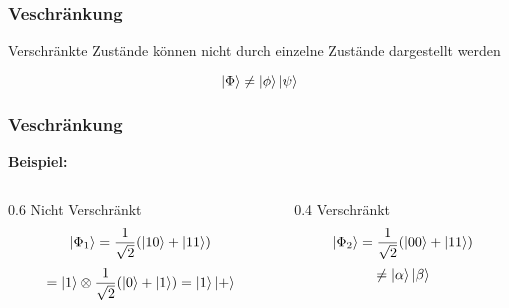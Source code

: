 \begin{frame}
    \frametitle{Veschränkung}
    
    Verschränkte Zustände können nicht durch einzelne Zustände dargestellt werden

    \hfil

    $$\ket{\Phi} \neq \ket{\phi} \ket{\psi}$$

\end{frame}

\begin{frame}
    \frametitle{Veschränkung}
    \textbf{Beispiel:}

    \hfil

    \begin{columns}[c]
        \begin{column}{0.6\hsize}\centering
        Nicht Verschränkt
        $$\ket{\Phi_1} = \frac{1}{\sqrt{2}} ( \ket{10} + \ket{11})$$
        $$= \ket{1}\otimes \frac{1}{\sqrt{2}} ( \ket{0} + \ket{1})= \ket{1} \ket{+}$$
        \end{column}

        \begin{column}{0.4\hsize}
        Verschränkt
        $$\ket{\Phi_2} = \frac{1}{\sqrt{2}} ( \ket{00} + \ket{11})$$
        $$\neq \ket{\alpha}\ket{\beta}$$

        \end{column}
    \end{columns}

\end{frame}